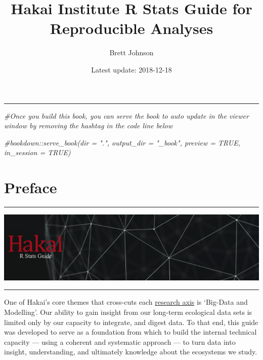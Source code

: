 \documentclass[]{book}
\title{Hakai Institute R Stats Guide for Reproducible Analyses}
\author{Brett Johnson}
\date{Latest update: 2018-12-18}
\newenvironment{Shaded}{\begin{snugshade}}{\end{snugshade}}
\newcommand{\CommentTok}[1]{\textcolor[rgb]{0.56,0.35,0.01}{\textit{#1}}}
\begin{document}
\maketitle

{
\setcounter{tocdepth}{0}
\tableofcontents
}
\begin{center}\rule{0.5\linewidth}{\linethickness}\end{center}

\begin{Shaded}
\begin{Highlighting}[]
\CommentTok{#Once you build this book, you can serve the book to auto update in the viewer window by removing the hashtag in the code line below}

\CommentTok{#bookdown::serve_book(dir = ".", output_dir = "_book", preview = TRUE, in_session = TRUE)}
\end{Highlighting}
\end{Shaded}

\chapter*{Preface}\label{preface}

\begin{center}\rule{0.5\linewidth}{\linethickness}\end{center}

\includegraphics[width=9.97in]{images/r_stats_red}

\begin{center}\rule{0.5\linewidth}{\linethickness}\end{center}

One of Hakai's core themes that cross-cuts each
\href{https://www.hakai.org/research}{research axis} is `Big-Data and
Modelling'. Our ability to gain insight from our long-term ecological
data sets is limited only by our capacity to integrate, and digest data.
To that end, this guide was developed to serve as a foundation from
which to build the internal technical capacity --- using a coherent and
systematic approach --- to turn data into insight, understanding, and
ultimately knowledge about the ecosystems we study.
\end{document}
